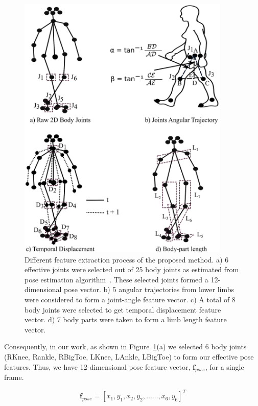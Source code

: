 \begin{figure}
	\centering 
	\includegraphics[width = 0.9\textwidth]{figures/extracted_features.eps}
	\caption[Different feature extraction process of the proposed method]
	{Different feature extraction process of the proposed method. a) 6 effective joints were selected out of 25 body joints as estimated from pose estimation algorithm~\cite{Cao_19}. These selected joints formed a 12-dimensional pose vector. b) 5 angular trajectories from lower limbs were considered to form a joint-angle feature vector. c) A total of 8 body joints were selected to get temporal displacement feature vector. d) 7 body parts were taken to form a limb length feature vector.\label{fig:extracted_features}
	}
\end{figure}

Consequently, in our work, as shown in Figure~\ref{fig:extracted_features}(a) we selected 6 body joints (RKnee, Rankle, RBigToe, LKnee, LAnkle, LBigToe) to form our effective pose features. Thus, we have 12-dimensional pose feature vector, $\textbf{f}_{pose}$, for a single frame. 

\begin{equation}
  \textbf {f}_{pose}= [x_1, y_1, x_2, y_2, \ldots\ldots, x_6, y_6]^T
\end{equation}

